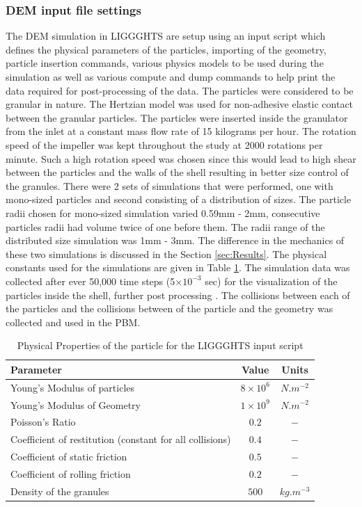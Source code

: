 \documentclass[preprint,11pt,authoryear]{elsarticle}
\begin{document}
\subsubsection{DEM input file settings}
 The DEM simulation in LIGGGHTS are setup using an input script which defines the physical 
parameters of the particles, importing of the geometry, particle insertion commands, various physics 
models to be used during the simulation as well as various compute and dump commands to help print 
the data required for post-processing of the data. The particles were considered to be granular in 
nature. The Hertzian model was used for non-adhesive elastic contact between the granular particles. 
The particles were inserted inside the granulator from the inlet at a constant mass flow rate of 15 
kilograms per hour. The rotation speed of the impeller was kept throughout the study at 2000 rotations 
per minute. Such a high rotation speed was chosen since this would lead to high shear between the 
particles and the walls of the shell resulting in better size control of the granules. There were 2 sets of 
simulations that were performed, one with mono-sized particles and second consisting of a distribution 
of sizes. The particle radii chosen for mono-sized simulation varied 0.59mm - 2mm, consecutive 
particles radii had volume twice of one before them. The radii range of the distributed size simulation 
was 1mm - 3mm. The difference in the mechanics of these two simulations is discussed in the Section \ref{sec:Results}. 
The physical constants used for the simulations are given in Table 
\ref{table:mthds_dem_input}.
 The simulation data was collected after ever 50,000 time steps (5$\times 10^{-3}$ sec) 
for the visualization of the particles inside the shell, further post processing . The collisions 
between each of the particles and the collisions between of the particle and the geometry was 
collected and used in the PBM. 

\begin{table}[!htb]%
\caption{Physical Properties of the particle for the LIGGGHTS input script} 
\label{table:mthds_dem_input}
\begin{center}
\begin{tabular}{l|c|c}
\hline
\bf{Parameter} &\bf{Value} &\bf{Units}\\
\hline
Young's Modulus of particles  & $8 \times 10^{6}$ & $N.m^{-2}$\\
Young's Modulus of Geometry  & $1 \times 10^{9}$ & $N.m^{-2}$\\
Poisson's Ratio & $0.2$ & $-$\\
Coefficient of restitution (constant for all collisions) & $0.4$ & $-$\\
Coefficient of static friction & $0.5$ & $-$\\
Coefficient of rolling friction  & $0.2$ & $-$\\
Density of the granules & $500$ & $kg.m^{-3}$\\
\hline
\end{tabular}
\end{center}
\end{table}
\end{document}
